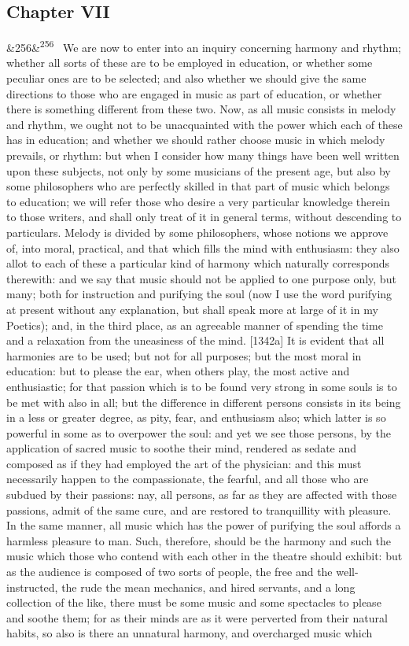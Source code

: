 \documentclass[12pt]{article}
\newcommand{\para}[1][]{\par\noindent\ifx&#1&\else\textsuperscript{\footnotesize #1}~\fi}
\begin{document}
\subsection*{Chapter VII}

\para[256] We are now to enter into an inquiry concerning harmony and rhythm; whether all sorts of these are to be employed in education, or whether some peculiar ones are to be selected; and also whether we should give the same directions to those who are engaged in music as part of education, or whether there is something different from these two. Now, as all music consists in melody and rhythm, we ought not to be unacquainted with the power which each of these has in education; and whether we should rather choose music in which melody prevails, or rhythm: but when I consider how many things have been well written upon these subjects, not only by some musicians of the present age, but also by some philosophers who are perfectly skilled in that part of music which belongs to education; we will refer those who desire a very particular knowledge therein to those writers, and shall only treat of it in general terms, without descending to particulars. Melody is divided by some philosophers, whose notions we approve of, into moral, practical, and that which fills the mind with enthusiasm: they also allot to each of these a particular kind of harmony which naturally corresponds therewith: and we say that music should not be applied to one purpose only, but many; both for instruction and purifying the soul (now I use the word purifying at present without any explanation, but shall speak more at large of it in my Poetics); and, in the third place, as an agreeable manner of spending the time and a relaxation from the uneasiness of the mind. [1342a] It is evident that all harmonies are to be used; but not for all purposes; but the most moral in education: but to please the ear, when others play, the most active and enthusiastic; for that passion which is to be found very strong in some souls is to be met with also in all; but the difference in different persons consists in its being in a less or greater degree, as pity, fear, and enthusiasm also; which latter is so powerful in some as to overpower the soul: and yet we see those persons, by the application of sacred music to soothe their mind, rendered as sedate and composed as if they had employed the art of the physician: and this must necessarily happen to the compassionate, the fearful, and all those who are subdued by their passions: nay, all persons, as far as they are affected with those passions, admit of the same cure, and are restored to tranquillity with pleasure. In the same manner, all music which has the power of purifying the soul affords a harmless pleasure to man. Such, therefore, should be the harmony and such the music which those who contend with each other in the theatre should exhibit: but as the audience is composed of two sorts of people, the free and the well-instructed, the rude the mean mechanics, and hired servants, and a long collection of the like, there must be some music and some spectacles to please and soothe them; for as their minds are as it were perverted from their natural habits, so also is there an unnatural harmony, and overcharged music which 
\end{document}

